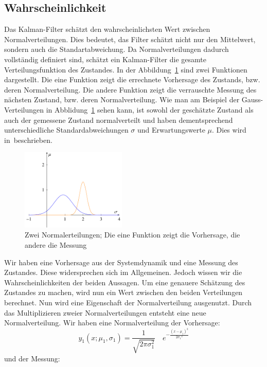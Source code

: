 \subsection{Wahrscheinlichkeit}
Das Kalman-Filter schätzt den wahrscheinlichsten Wert zwischen Normalverteilungen.
Dies bedeutet, das Filter schätzt nicht nur den Mittelwert, sondern auch die Standartabweichung.
Da Normalverteilungen dadurch vollständig definiert sind, schätzt ein Kalman-Filter die gesamte Verteilungsfunktion des Zustandes.
In der Abbildung~\ref{erdbeben: Zwei Normalverteilungen} sind zwei Funktionen dargestellt. 
Die eine Funktion zeigt die errechnete Vorhersage des Zustands, bzw. deren Normalverteilung. 
Die andere Funktion zeigt die verrauschte Messung des nächsten Zustand, bzw. deren Normalverteilung. 
Wie man am Beispiel der Gauss-Verteilungen in Abblidung~\ref{erdbeben: Zwei Normalverteilungen} sehen kann, ist sowohl der geschätzte Zustand als auch der gemessene Zustand normalverteilt und haben dementsprechend unterschiedliche Standardabweichungen $\sigma$ und Erwartungswerte $\mu$. Dies wird in~\cite{erdbeben:aragher_understanding_2012}beschrieben.
\begin{figure}
 \begin{center}
 \includegraphics[width=5cm]{papers/erdbeben/Gausskurve2.pdf}
 \caption{Zwei Normalerteilungen; Die eine Funktion zeigt die Vorhersage, die andere die Messung}
    \label{erdbeben: Zwei Normalverteilungen}
 \end{center}
\end{figure}
Wir haben eine Vorhersage aus der Systemdynamik und eine Messung des Zustandes.
Diese widersprechen sich im Allgemeinen. 
Jedoch wissen wir die Wahrscheinlichkeiten der beiden Aussagen. 
Um eine genauere Schätzung des Zustandes zu machen, wird nun ein Wert zwischen den beiden Verteilungen berechnet. 
Nun wird eine Eigenschaft der Normalverteilung ausgenutzt. Durch das Multiplizieren zweier Normalverteilungen entsteht eine neue Normalverteilung. 
Wir haben eine Normalverteilung der Vorhersage:
\[ 
{y_1}(x;{\mu_1},{\sigma_1})=\frac{1}{\sqrt{2\pi\sigma_1^2}}\quad e^{-\frac{(x-{\mu_1})^2}{2{\sigma_1}^2}} 
\]
und der Messung:
